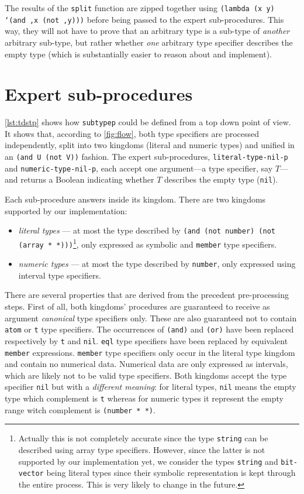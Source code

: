 \documentclass[format=sigconf]{acmart}
\newcommand\code[2][\small]{\sloppy\texttt{#1#2}}
\newcommand\footcode[1]{\code[\scriptsize]{#1}}
\theoremstyle{definition}
\begin{document}
The results of the \code{split} function are zipped together using
\code{(lambda (x y) `(and ,x (not ,y)))} before being passed to the expert
sub-procedures. This way, they will not have to prove that an arbitrary type is a
sub-type of \emph{another} arbitrary sub-type, but rather whether \emph{one}
arbitrary type specifier describes the empty type (which is substantially
easier to reason about and implement).

\section{Expert sub-procedures}
\label{sec:exp}
\vref{lst:tdstp} shows how \code{subtypep} could be defined from a top down
point of view. It shows that, according to \vref{fig:flow}, both type
specifiers are processed independently, split into two kingdoms (literal and
numeric types) and unified in an \code{(and U (not V))} fashion. The
expert sub-procedures, \code{literal-type-nil-p} and \code{numeric-type-nil-p},
each accept one argument---a type specifier, say $T$---and returns a Boolean
indicating whether $T$ describes the empty type (\code{nil}).

Each sub-procedure answers inside its kingdom. There are two kingdoms supported
by our implementation:
\begin{itemize}
\item \emph{literal types} --- at most the type described by \code{(and (not
    number) (not (array * *)))}\footnote{
    Actually this is not completely accurate since the type \footcode{string}
    can be described using array type specifiers. However, since the latter is
    not supported by our implementation yet, we consider the types
    \footcode{string} and \footcode{bit-vector} being literal types since their
    symbolic representation is kept through the entire process. This is very
    likely to change in the future.
    }, only expressed as symbolic and \code{member} type
  specifiers.
\item \emph{numeric types} --- at most the type described by \code{number}, only
  expressed using interval type specifiers.
\end{itemize}

There are several properties that are derived from the precedent pre-processing
steps. First of all, both kingdoms' procedures are guaranteed to receive as
argument \emph{canonical} type specifiers only. These are also guaranteed not to
contain \code{atom} or \code{t} type specifiers. The occurrences of \code{(and)}
and \code{(or)} have been replaced respectively by \code{t} and \code{nil}.
\code{eql} type specifiers have been replaced by equivalent \code{member} expressions.
\code{member} type specifiers only occur in the literal type kingdom and contain
no numerical data. Numerical data are only expressed as intervals, which are likely
not to be valid type specifiers. Both kingdoms accept the type specifier
\code{nil} but with a \emph{different meaning}: for literal types, \code{nil}
means the empty type which complement is \code{t} whereas for numeric types it
represent the empty range witch complement is \code{(number * *)}.
\end{document}
